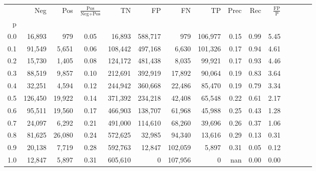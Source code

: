 \begin{tabular}{rrrcrrrrrrrrrrr}
\toprule
{} &      Neg &     Pos & $\frac{\text{Pos}}{\text{Neg}+\text{Pos}}$ &       TN &       FP &       FN &       TP &  Prec &   Rec & $\frac{\text{FP}}{\text{P}}$ \\
p   &          &         &                                            &          &          &          &          &       &       &                              \\
\midrule
0.0 &   16,893 &     979 &                                       0.05 &   16,893 &  588,717 &      979 &  106,977 &  0.15 &  0.99 &                         5.45 \\
0.1 &   91,549 &   5,651 &                                       0.06 &  108,442 &  497,168 &    6,630 &  101,326 &  0.17 &  0.94 &                         4.61 \\
0.2 &   15,730 &   1,405 &                                       0.08 &  124,172 &  481,438 &    8,035 &   99,921 &  0.17 &  0.93 &                         4.46 \\
0.3 &   88,519 &   9,857 &                                       0.10 &  212,691 &  392,919 &   17,892 &   90,064 &  0.19 &  0.83 &                         3.64 \\
0.4 &   32,251 &   4,594 &                                       0.12 &  244,942 &  360,668 &   22,486 &   85,470 &  0.19 &  0.79 &                         3.34 \\
0.5 &  126,450 &  19,922 &                                       0.14 &  371,392 &  234,218 &   42,408 &   65,548 &  0.22 &  0.61 &                         2.17 \\
0.6 &   95,511 &  19,560 &                                       0.17 &  466,903 &  138,707 &   61,968 &   45,988 &  0.25 &  0.43 &                         1.28 \\
0.7 &   24,097 &   6,292 &                                       0.21 &  491,000 &  114,610 &   68,260 &   39,696 &  0.26 &  0.37 &                         1.06 \\
0.8 &   81,625 &  26,080 &                                       0.24 &  572,625 &   32,985 &   94,340 &   13,616 &  0.29 &  0.13 &                         0.31 \\
0.9 &   20,138 &   7,719 &                                       0.28 &  592,763 &   12,847 &  102,059 &    5,897 &  0.31 &  0.05 &                         0.12 \\
1.0 &   12,847 &   5,897 &                                       0.31 &  605,610 &        0 &  107,956 &        0 &   nan &  0.00 &                         0.00 \\
\bottomrule
\end{tabular}
